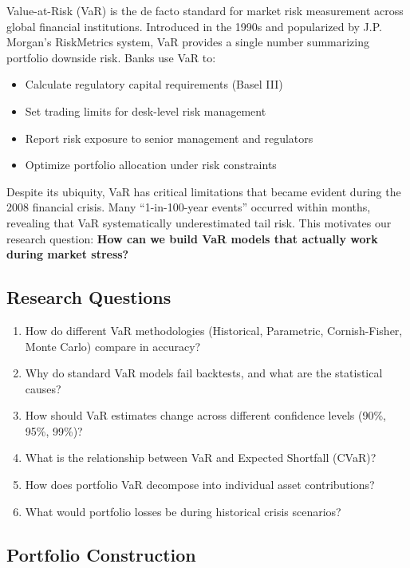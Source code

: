 \documentclass[12pt,a4paper]{article}
\begin{document}
Value-at-Risk (VaR) is the de facto standard for market risk measurement across global financial institutions. Introduced in the 1990s and popularized by J.P. Morgan's RiskMetrics system, VaR provides a single number summarizing portfolio downside risk. Banks use VaR to:

\begin{itemize}
    \item Calculate regulatory capital requirements (Basel III)
    \item Set trading limits for desk-level risk management
    \item Report risk exposure to senior management and regulators
    \item Optimize portfolio allocation under risk constraints
\end{itemize}

Despite its ubiquity, VaR has critical limitations that became evident during the 2008 financial crisis. Many ``1-in-100-year events'' occurred within months, revealing that VaR systematically underestimated tail risk. This motivates our research question: \textbf{How can we build VaR models that actually work during market stress?}

\subsection{Research Questions}

\begin{enumerate}
    \item How do different VaR methodologies (Historical, Parametric, Cornish-Fisher, Monte Carlo) compare in accuracy?
    \item Why do standard VaR models fail backtests, and what are the statistical causes?
    \item How should VaR estimates change across different confidence levels (90\%, 95\%, 99\%)?
    \item What is the relationship between VaR and Expected Shortfall (CVaR)?
    \item How does portfolio VaR decompose into individual asset contributions?
    \item What would portfolio losses be during historical crisis scenarios?
\end{enumerate}

\subsection{Portfolio Construction}
\end{document}
